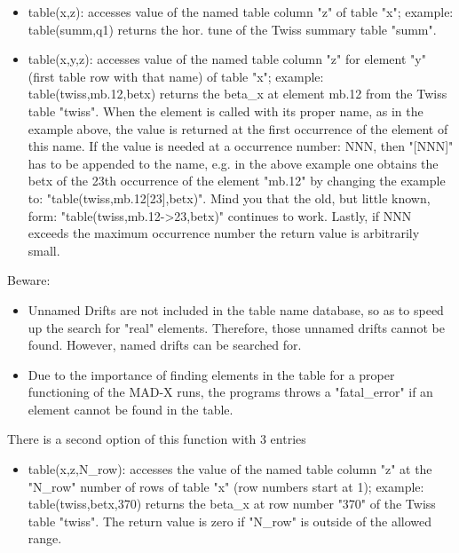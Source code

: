 \begin{itemize}
	\item table(x,z): accesses value of the named table column "z"
          of table "x"; example: table(summ,q1) returns the hor. tune of
          the Twiss summary table "summ".  
	\item table(x,y,z): accesses value of the named table column "z"
          for element "y" (first table row with that name) of table "x";
          example: table(twiss,mb.12,betx) returns the beta\_x at
          element mb.12 from the Twiss table "twiss".   When the element
          is called with its proper name, as in the example above, the
          value is returned at the first occurrence of the element of
          this name. If the value is needed at a occurrence number: NNN,
          then "[NNN]" has to be appended to the name, e.g. in the above
          example one obtains the betx of the 23th occurrence of the
          element "mb.12" by changing the example to:
          "table(twiss,mb.12[23],betx)". Mind you that the old, but
          little known, form: "table(twiss,mb.12-\textgreater 23,betx)"
          continues to work. Lastly, if NNN exceeds the maximum
          occurrence number the return value is arbitrarily small.  
\end{itemize}

Beware: 
\begin{itemize}
   \item  Unnamed Drifts are not included in the table name
          database, so as to speed up the search for "real"
          elements. Therefore, those  unnamed drifts cannot be
          found. However, named drifts can be searched for.  
   \item  Due to the importance of finding elements in the table
          for a proper functioning of the MAD-X runs, the programs
          throws a "fatal\_error" if an element cannot be found in the
          table.   
\end{itemize}

There is a second option of this function with 3 entries  
\begin{itemize}
    \item table(x,z,N\_row): accesses the value of the named table
          column  "z" at the "N\_row" number of rows of table "x" (row
          numbers start at  1); example: table(twiss,betx,370) returns
          the beta\_x at row number  "370" of the Twiss table
          "twiss". The return value is zero if "N\_row"  is outside of
          the allowed range.
\end{itemize}

